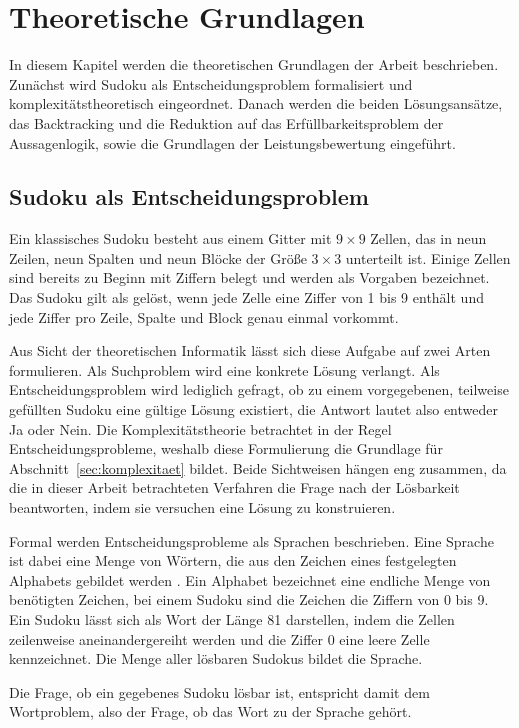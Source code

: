 \section{Theoretische Grundlagen}\label{sec:grundlagen}
In diesem Kapitel werden die theoretischen Grundlagen der Arbeit beschrieben. Zunächst wird Sudoku als Entscheidungsproblem formalisiert und komplexitätstheoretisch eingeordnet. Danach werden die beiden Lösungsansätze, das Backtracking und die Reduktion auf das Erfüllbarkeitsproblem der Aussagenlogik, sowie die Grundlagen der Leistungsbewertung eingeführt.

\subsection{Sudoku als Entscheidungsproblem}\label{sec:csp}
Ein klassisches Sudoku besteht aus einem Gitter mit $9 \times 9$ Zellen, das in neun Zeilen, neun Spalten und neun Blöcke der Größe $3 \times 3$ unterteilt ist. Einige Zellen sind bereits zu Beginn mit Ziffern belegt und werden als Vorgaben bezeichnet. Das Sudoku gilt als gelöst, wenn jede Zelle eine Ziffer von 1 bis 9 enthält und jede Ziffer pro Zeile, Spalte und Block genau einmal vorkommt.

Aus Sicht der theoretischen Informatik lässt sich diese Aufgabe auf zwei Arten formulieren. Als Suchproblem wird eine konkrete Lösung verlangt. 
Als Entscheidungsproblem wird lediglich gefragt, ob zu einem vorgegebenen, teilweise gefüllten Sudoku eine gültige Lösung existiert, die Antwort lautet also entweder Ja oder Nein. Die Komplexitätstheorie betrachtet in der Regel Entscheidungsprobleme, weshalb diese Formulierung die Grundlage für Abschnitt~\ref{sec:komplexitaet} bildet. Beide Sichtweisen hängen eng zusammen, da die in dieser Arbeit betrachteten Verfahren die Frage nach der Lösbarkeit beantworten, indem sie versuchen eine Lösung zu konstruieren.

Formal werden Entscheidungsprobleme als Sprachen beschrieben. Eine Sprache ist dabei eine Menge von Wörtern, die aus den Zeichen eines festgelegten Alphabets gebildet werden . Ein Alphabet bezeichnet eine endliche Menge von benötigten Zeichen, bei einem Sudoku sind die Zeichen die Ziffern von 0 bis 9. Ein Sudoku lässt sich als Wort der Länge 81 darstellen, indem die Zellen zeilenweise aneinandergereiht werden und die Ziffer 0 eine leere Zelle kennzeichnet. Die Menge aller lösbaren Sudokus bildet die Sprache.

Die Frage, ob ein gegebenes Sudoku lösbar ist, entspricht damit dem Wortproblem, also der Frage, ob das Wort zu der Sprache gehört.

